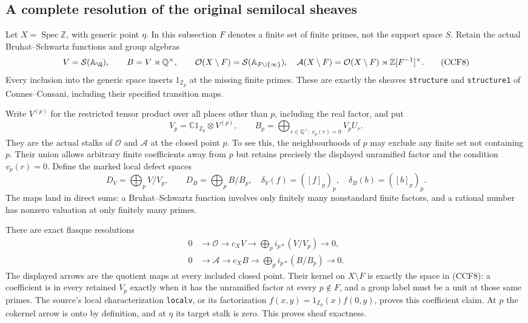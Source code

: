 \documentclass[11pt,a4paper]{article}
\theoremstyle{definition}\newtheorem{definition}[theorem]{Definition}
\newcommand{\Spec}{\operatorname{Spec}}\newcommand{\SpecMon}{\operatorname{Spec}_{\mathrm{mon}}}
\begin{document}
\subsection{A complete resolution of the original semilocal sheaves}

Let $X=\Spec\mathbb Z$, with generic point $\eta$. In this subsection
$F$ denotes a finite set of finite primes, not the support space $S$.
Retain the actual Bruhat--Schwartz functions and group algebras
\[
 V=\mathcal S(\mathbb A_{\Q}),\qquad
 B=V\rtimes\mathbb Q^\times,\qquad
 \mathcal O(X\setminus F)=\mathcal S(\mathbb A_{F\cup\{\infty\}}),
 \quad
 \mathcal A(X\setminus F)=\mathcal O(X\setminus F)
               \rtimes\mathbb Z[F^{-1}]^\times.
 \tag{CCF8}
\]
Every inclusion into the generic space inserts $1_{\mathbb Z_p}$
at the missing finite primes. These are exactly the sheaves
\texttt{structure} and \texttt{structure1} of Connes--Consani,
including their specified transition maps.

Write $V^{(p)}$ for the restricted tensor product over all places
other than $p$, including the real factor, and put
\[
 V_p=\mathbb C1_{\mathbb Z_p}\otimes V^{(p)},\qquad
 B_p=\bigoplus_{r\in\mathbb Q^\times:\ v_p(r)=0}V_pU_r.
 \tag{CCF9}
\]
They are the actual stalks of $\mathcal O$ and $\mathcal A$ at
the closed point $p$. To see this, the neighbourhoods of $p$ may
exclude any finite set not containing $p$. Their union allows
arbitrary finite coefficients away from $p$ but retains precisely
the displayed unramified factor and the condition $v_p(r)=0$.
Define the marked local defect spaces
\[
 D_V=\bigoplus_p V/V_p,\qquad D_B=\bigoplus_p B/B_p,
 \quad \delta_V(f)=([f]_p)_p,\quad\delta_B(b)=([b]_p)_p.
 \tag{CCF10}
\]
The maps land in direct sums: a Bruhat--Schwartz function involves
only finitely many nonstandard finite factors, and a rational
number has nonzero valuation at only finitely many primes.

There are exact flasque resolutions
\[
 \begin{aligned}
 0&\longrightarrow\mathcal O\longrightarrow c_XV
       \longrightarrow\bigoplus_p i_{p*}(V/V_p)\longrightarrow0,\\
 0&\longrightarrow\mathcal A\longrightarrow c_XB
       \longrightarrow\bigoplus_p i_{p*}(B/B_p)\longrightarrow0.
 \end{aligned}
 \tag{CCF11}
\]
The displayed arrows are the quotient maps at every included
closed point. Their kernel on $X\setminus F$ is exactly the
space in (CCF8): a coefficient is in every retained $V_p$ exactly
when it has the unramified factor at every $p\notin F$, and a
group label must be a unit at those same primes. The source's
local characterization \texttt{localv}, or its factorization
$f(x,y)=1_{\mathbb Z_p}(x)f(0,y)$, proves this coefficient claim.
At $p$ the cokernel arrow is onto by definition, and at $\eta$
its target stalk is zero. This proves sheaf exactness.
\end{document}
